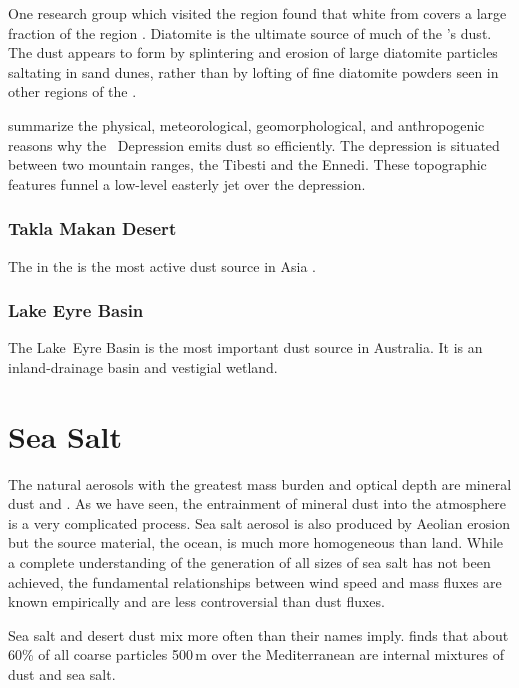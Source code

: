 \documentclass[12pt,twoside]{book}
\begin{document}
One research group which visited the region found that white
 from  covers a large
fraction of the region \cite[][]{Gil05}. 
Diatomite is the ultimate source of much of the \Bodele's dust.
The dust appears to form by splintering and erosion of large diatomite
particles saltating in sand dunes, rather than by lofting of fine
diatomite powders seen in other regions of the .

\cite{WTL06} summarize the physical, meteorological, geomorphological,
and anthropogenic reasons why the \Bodele\ Depression emits dust so
efficiently. 
The depression is situated between two mountain ranges, the Tibesti
and the Ennedi.
These topographic features funnel a low-level easterly jet over the
depression. 

\subsection[Takla Makan Desert]{Takla Makan Desert}\label{sxn:takla}
The  in the  is the most
active dust source in Asia \cite[][]{HPS97,HBT97,PGT02}. 

\subsection[Lake Eyre Basin]{Lake Eyre Basin}\label{sxn:ayre}
The Lake~Eyre Basin is the most important dust source in Australia.
It is an inland-drainage basin and vestigial wetland.

\chapter[Sea Salt]{Sea Salt}\label{sxn:ssl}
The natural aerosols with the greatest mass burden and optical
depth are mineral dust and .
As we have seen, the entrainment of mineral dust into the atmosphere
is a very complicated process.
Sea salt aerosol is also produced by Aeolian erosion but the source
material, the ocean, is much more homogeneous than land.
While a complete understanding of the generation of all sizes of sea
salt has not been achieved, the fundamental relationships between
wind speed and mass fluxes are known empirically and are less
controversial than dust fluxes.

Sea salt and desert dust mix more often than their names imply.
 finds that about 60\% of all coarse
particles 500\,m over the Mediterranean are internal mixtures of
dust and sea salt.
\end{document}

